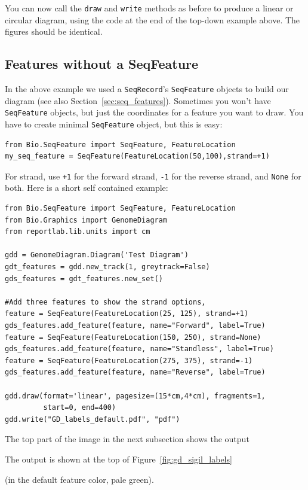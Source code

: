 \documentclass{report}
\begin{document}
You can now call the \verb|draw| and \verb|write| methods as before to produce
a linear or circular diagram, using the code at the end of the top-down example
above.  The figures should be identical.

\subsection{Features without a SeqFeature}
\label{sec:gd_features_without_seqfeatures}

In the above example we used a \verb|SeqRecord|'s \verb|SeqFeature| objects
to build our diagram (see also Section~\ref{sec:seq_features}).
Sometimes you won't have \verb|SeqFeature| objects,
but just the coordinates for a feature you want to draw.  You have to create
minimal \verb|SeqFeature| object, but this is easy:

\begin{verbatim}
from Bio.SeqFeature import SeqFeature, FeatureLocation
my_seq_feature = SeqFeature(FeatureLocation(50,100),strand=+1)
\end{verbatim}

For strand, use \texttt{+1} for the forward strand, \texttt{-1} for the
reverse strand, and \texttt{None} for both.  Here is a short self contained
example:

\begin{verbatim}
from Bio.SeqFeature import SeqFeature, FeatureLocation
from Bio.Graphics import GenomeDiagram
from reportlab.lib.units import cm

gdd = GenomeDiagram.Diagram('Test Diagram')
gdt_features = gdd.new_track(1, greytrack=False)
gds_features = gdt_features.new_set()

#Add three features to show the strand options,
feature = SeqFeature(FeatureLocation(25, 125), strand=+1)
gds_features.add_feature(feature, name="Forward", label=True)
feature = SeqFeature(FeatureLocation(150, 250), strand=None)
gds_features.add_feature(feature, name="Standless", label=True)
feature = SeqFeature(FeatureLocation(275, 375), strand=-1)
gds_features.add_feature(feature, name="Reverse", label=True)

gdd.draw(format='linear', pagesize=(15*cm,4*cm), fragments=1,
         start=0, end=400)
gdd.write("GD_labels_default.pdf", "pdf")
\end{verbatim}

\begin{htmlonly}
The top part of the image in the next subsection shows the output
\end{htmlonly}
\begin{latexonly}
The output is shown at the top of Figure~\ref{fig:gd_sigil_labels}
\end{latexonly}
(in the default feature color, pale green).
\end{document}
